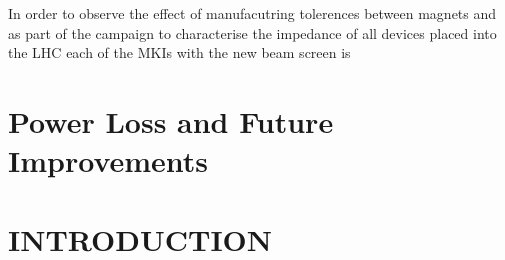 \documentclass[a4paper,
              ]{jacow}
\begin{document}
In order to observe the effect of manufacutring tolerences between magnets and as part of the campaign to characterise the impedance of all devices placed into the LHC each of the MKIs with the new beam screen is 

\section{Power Loss and Future Improvements}

%
%
%

% 

\section{INTRODUCTION}
\end{document}

